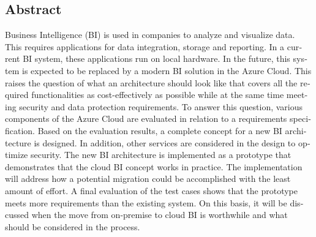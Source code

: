 

\begin{otherlanguage}{american}
	\chapter*{Abstract}
    Business Intelligence (BI) is used in companies to analyze and visualize data. This requires applications for data integration, storage and reporting. In a current BI system, these applications run on local hardware. In the future, this system is expected to be replaced by a modern BI solution in the Azure Cloud. This raises the question of what an architecture should look like that covers all the required functionalities as cost-effectively as possible while at the same time meeting security and data protection requirements. To answer this question, various components of the Azure Cloud are evaluated in relation to a requirements specification. Based on the evaluation results, a complete concept for a new BI architecture is designed. In addition, other services are considered in the design to optimize security. The new BI architecture is implemented as a prototype that demonstrates that the cloud BI concept works in practice. The implementation will address how a potential migration could be accomplished with the least amount of effort. A final evaluation of the test cases shows that the prototype meets more requirements than the existing system.  On this basis, it will be discussed when the move from on-premise to cloud BI is worthwhile and what should be considered in the process. \end{otherlanguage}


  